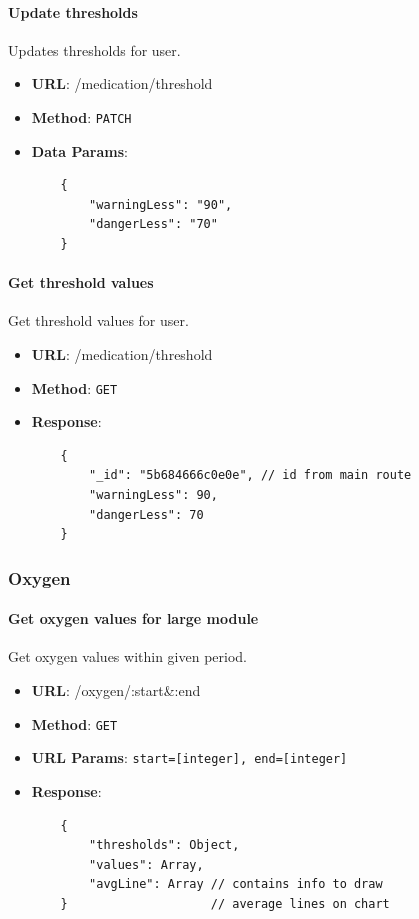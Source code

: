         \paragraph{Update thresholds} Updates thresholds for user.
        \begin{itemize}
            \item \textbf{URL}: /medication/threshold
            \item \textbf{Method}: \texttt{PATCH}
            \item \textbf{Data Params}: \begin{verbatim}
    {
        "warningLess": "90",
        "dangerLess": "70"
    }  
            \end{verbatim}
        \end{itemize}

        \paragraph{Get threshold values} Get threshold values for user.
        \begin{itemize}
            \item \textbf{URL}: /medication/threshold
            \item \textbf{Method}: \texttt{GET}
            \item \textbf{Response}: \begin{verbatim}
    {
        "_id": "5b684666c0e0e", // id from main route
        "warningLess": 90,
        "dangerLess": 70
    }
            \end{verbatim}
        \end{itemize}

    \subsubsection{Oxygen}

        \paragraph{Get oxygen values for large module} Get oxygen values within given period.
        \begin{itemize}
            \item \textbf{URL}: /oxygen/:start\&:end
            \item \textbf{Method}: \texttt{GET}
            \item \textbf{URL Params}: \texttt{start=[integer], end=[integer]}
            \item \textbf{Response}: \begin{verbatim}
    {
        "thresholds": Object,
        "values": Array,
        "avgLine": Array // contains info to draw 
    }                    // average lines on chart
            \end{verbatim}
        \end{itemize}

